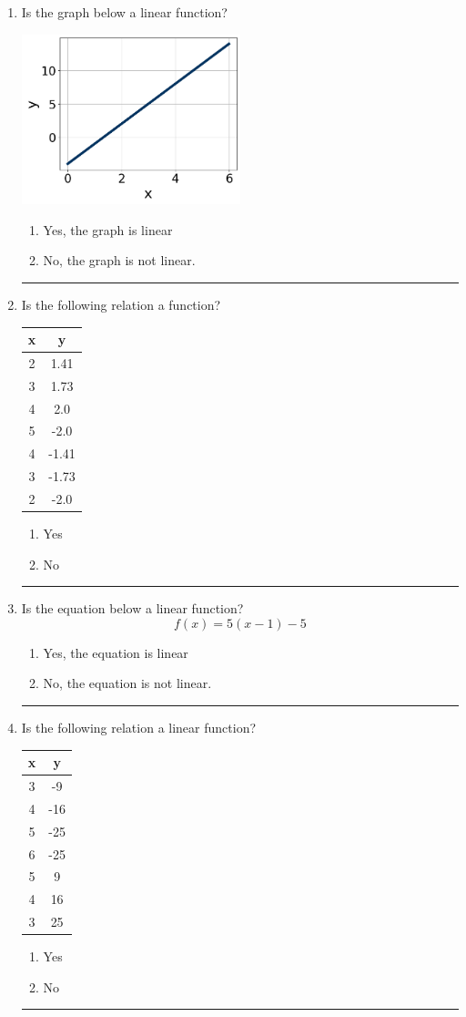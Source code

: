 \documentclass[14pt]{extbook}
\newcommand{\litem}[1]{\item#1\hspace*{-1cm}\rule{\textwidth}{0.4pt}}
\begin{document}
\begin{enumerate}
\litem{
Is the graph below a linear function?
\begin{center}
    \includegraphics[width=0.5\textwidth]{../Figures/MA_8_F_1_2_graphI.png}
\end{center}
\begin{enumerate}[label=\Alph*.]
\item Yes, the graph is linear
\item No, the graph is not linear.

\end{enumerate} }
\litem{
Is the following relation a function?

\begin{tabular}{c|c}
x &y\tabularnewline \hline
2 &1.41\tabularnewline \hline
3 &1.73\tabularnewline \hline
4 &2.0\tabularnewline \hline
5 &-2.0\tabularnewline \hline
4 &-1.41\tabularnewline \hline
3 &-1.73\tabularnewline \hline
2 &-2.0\end{tabular}\begin{enumerate}[label=\Alph*.]
\item Yes
\item No

\end{enumerate} }
\litem{
Is the equation below a linear function?\[ f(x) = 5(x -1)-5 \]\begin{enumerate}[label=\Alph*.]
\item Yes, the equation is linear
\item No, the equation is not linear.

\end{enumerate} }
\litem{
Is the following relation a linear function?

\begin{tabular}{c|c}
x &y\tabularnewline \hline
3 &-9\tabularnewline \hline
4 &-16\tabularnewline \hline
5 &-25\tabularnewline \hline
6 &-25\tabularnewline \hline
5 &9\tabularnewline \hline
4 &16\tabularnewline \hline
3 &25\end{tabular}\begin{enumerate}[label=\Alph*.]
\item Yes
\item No

\end{enumerate} }
\end{enumerate}
\end{document}
